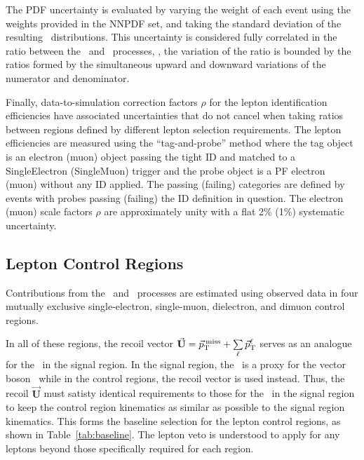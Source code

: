 The PDF uncertainty is evaluated by varying the weight of each event using the weights provided in the NNPDF set, and taking the standard deviation of the resulting \ETg\ distributions. 
This uncertainty is considered fully correlated in the ratio between the \zinvg\ and \wlng\ processes, \ie, the variation of the ratio is bounded by the ratios formed by the simultaneous upward and downward variations of the numerator and denominator.

Finally, data-to-simulation correction factors $\rho$ for the lepton identification efficiencies have associated uncertainties that do not cancel when taking ratios between regions defined by different lepton selection requirements.
The lepton efficiencies are measured using the ``tag-and-probe'' method where the tag object is an electron (muon) object passing the tight ID  and matched to a SingleElectron (SingleMuon) trigger and the probe object is a PF electron (muon) without any ID applied.
The passing (failing) categories are defined by events with probes passing (failing) the ID definition in question.
The electron (muon) scale factors $\rho$ are approximately unity with a flat 2\% (1\%) systematic uncertainty.

\subsection{Lepton Control Regions}
\label{sec:control_regions}

Contributions from the \zinvg\ and \wlng\ processes are estimated using observed data in four mutually exclusive single-electron, single-muon, dielectron, and dimuon control regions.

In all of these regions, the recoil vector $\vec{\mathbf{U}} = {\vec p}_{\mathrm{T}}^{\kern2pt\text{miss}} + \sum\limits_\ell{\vec p}_{\mathrm{T}}^{\ell}$ serves as an analogue for the \ptvecmiss\ in the signal region.
In the signal region, the \ptvecmiss\ is a proxy for the vector boson \pt\ while in the control regions, the recoil vector is used instead. 
Thus, the recoil $\vec{\mathbf{U}}$ must satisty identical requirements to those for the \ptvecmiss\ in the signal region to keep the control region kinematics as similar as possible to the signal region kinematics.
This forms the baseline selection for the lepton control regions, as shown in Table~\ref{tab:baseline}.
The lepton veto is understood to apply for any leptons beyond those specifically required for each region.

